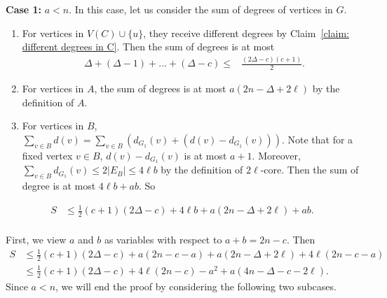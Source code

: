 \documentclass[12pt]{article}%
\begin{document}
\textbf{Case 1:} $a  < n$.
In this case, let us consider the sum of degrees of vertices in $G$.
\begin{enumerate}
	\item For vertices in $V(C) \cup \{u\}$, they receive different degrees by Claim~\ref{claim: different degrees in C}. Then the sum of degrees is at most
	\begin{equation*}
	\begin{aligned}
		&\Delta + (\Delta -1) + \ldots + (\Delta - c)
	\le &\frac{(2\Delta -c)(c+1)}{2}.
	\end{aligned}
	\end{equation*}
	\item For vertices in $A$, the sum of degrees is at most $a(2n-\Delta + 2\ell)$ by the definition of $A$.
	\item For vertices in $B$,
	 $\sum_{v \in B} d(v) = \sum_{v \in B} (d_{G_1}(v) + (d(v) - d_{G_1}(v)))$. Note that for a fixed vertex $v \in B$, $d(v) - d_{G_1}(v)$ is at most $a+1$.
	 Moreover, $\sum_{v \in B} d_{G_1}(v) \le 2|E_B| \le 4\ell b$ by the definition of $2\ell$-core.
	 Then the sum of degree is at most $4\ell b + a b$. So
\end{enumerate}
\begin{equation*}
\begin{aligned}
	S &\le \frac{1}{2}(c+1)(2\Delta - c) + 4\ell b + a(2n-\Delta + 2\ell) + a b.\\
\end{aligned}
\end{equation*}

First, we view $a$ and $b$ as variables with respect to $a+b=2n-c$.
Then
\begin{equation}\label{eq: count S}
\begin{aligned}
	S & \le \frac{1}{2}(c+1)(2\Delta - c) + a(2n-c-a) + a(2n-\Delta + 2\ell) + 4\ell(2n-c-a)\\
	& \le \frac{1}{2}(c+1)(2\Delta - c) + 4\ell(2n-c) -a^2 + a(4n-\Delta -c- 2\ell).
	\end{aligned}
	\end{equation}
	Since $a<n$, we will end the proof by considering the following two subcases.
\end{document}
